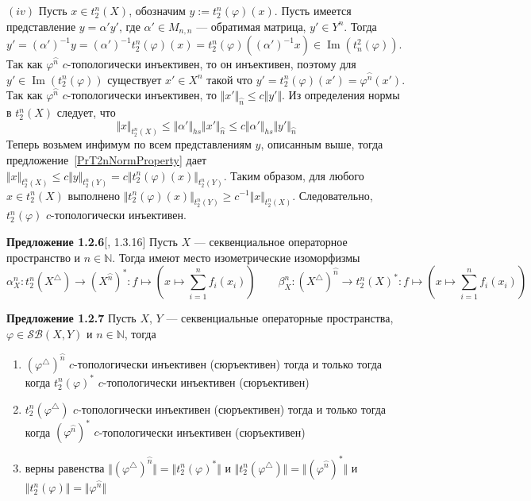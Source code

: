 \documentclass[12pt]{article}
\begin{document}
$(iv)$ Пусть $x\in t_2^n(X)$, обозначим $y:=t_2^n(\varphi)(x)$. Пусть имеется
представление $y=\alpha' y'$, где $\alpha'\in M_{n,n}$ --- обратимая матрица,
$y'\in Y^n$. Тогда
$y'={(\alpha')}^{-1}y={(\alpha')}^{-1}t_2^n(\varphi)(x)
=t_2^n(\varphi)({(\alpha')}^{-1}x)\in\operatorname{Im}(t_n^2(\varphi))
$. Так как $\varphi^{\wideparen{n}}$ $c$-топологически инъективен, то он
инъективен, поэтому для $y'\in \operatorname{Im}(t_2^n(\varphi))$ существует
$x'\in X^n$ такой что $y'=t_2^n(\varphi)(x')=\varphi^{\wideparen{n}}(x')$. Так
как $\varphi^{\wideparen{n}}$ $c$-топологически инъективен, то $\Vert
x'\Vert_{\wideparen{n}}\leq c\Vert y'\Vert$. Из определения нормы в $t_2^n(X)$
следует, что
$$
\Vert x\Vert_{t_2^n(X)}\leq\Vert\alpha'\Vert_{hs}\Vert x'\Vert_{\wideparen{n}}
\leq c\Vert\alpha'\Vert_{hs}\Vert y'\Vert_{\wideparen{n}}
$$
Теперь возьмем инфимум по всем представлениям $y$, описанным выше, тогда
предложение~\ref{PrT2nNormProperty} дает $\Vert x\Vert_{t_2^n(X)}\leq c\Vert
y\Vert_{t_2^n(Y)}=c\Vert t_2^n(\varphi)(x)\Vert_{t_2^n(Y)}$. Таким образом, для
любого $x\in t_2^n(X)$ выполнено $\Vert t_2^n(\varphi)(x)\Vert_{t_2^n(Y)}\geq
c^{-1}\Vert x\Vert_{t_2^n(X)}$. Следовательно, $t_2^n(\varphi)$
$c$-топологически инъективен.

\medskip

{\bf Предложение 1.2.6}[\cite{LamOpFolgen}, 1.3.16]\label{PrT2nTraingDuality}
Пусть $X$ --- секвенциальное операторное пространство и $n\in\mathbb{N}$. Тогда
имеют место изометрические изоморфизмы
$$
\alpha_X^n
:t_2^n(X^\triangle)\to {(X^{\wideparen{n}})}^*
:f\mapsto\left(x\mapsto\sum\limits_{i=1}^n f_i(x_i)\right)
\qquad
\beta_X^n
:{(X^\triangle)}^{\wideparen{n}}\to {t_2^n(X)}^*
:f\mapsto\left(x\mapsto\sum\limits_{i=1}^n f_i(x_i)\right)
$$

\medskip

{\bf Предложение 1.2.7}\label{PrTwoTypesDualOpEquiv} Пусть $X$, $Y$ ---
секвенциальные операторные пространства, $\varphi\in \mathcal{SB}(X,Y)$ и
$n\in\mathbb{N}$, тогда 
\begin{enumerate}[label = (\roman*)]
    \item ${(\varphi^\triangle)}^{\wideparen{n}}$ $c$-топологически инъективен
    (сюръективен) тогда и только тогда когда ${t_2^n(\varphi)}^*$
    $c$-топологически инъективен (сюръективен)

    \item $t_2^n(\varphi^\triangle)$ $c$-топологически инъективен (сюръективен)
    тогда и только тогда когда ${(\varphi^{\wideparen{n}})}^*$ $c$-топологически
    инъективен (сюръективен)

    \item верны равенства $\Vert {(\varphi^\triangle)}^{\wideparen{n}}\Vert=\Vert
    {t_2^n(\varphi)}^*\Vert$ и $\Vert t_2^n(\varphi^\triangle)\Vert=\Vert
    {(\varphi^{\wideparen{n}})}^*\Vert$ и  $\Vert
    t_2^n(\varphi)\Vert=\Vert\varphi^{\wideparen{n}}\Vert$
\end{enumerate}
\end{document}
